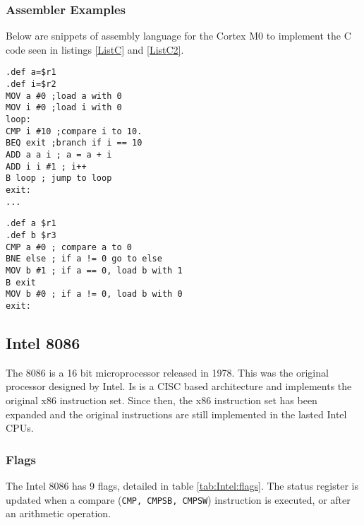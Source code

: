 \documentclass[12pt,a4paper]{article}
\begin{document}
\begin{bibunit}[is-unsrt]

\subsubsection{Assembler Examples}
Below are snippets of assembly language for the Cortex M0 to implement the C code seen in listings \ref{ListC} and \ref{ListC2}.
\begin{lstlisting}[frame=single,caption=Thumb/Thumb2 Assembler for code in listing \ref{ListC},label=ARM1]
.def a=$r1
.def i=$r2
MOV a #0 ;load a with 0
MOV i #0 ;load i with 0
loop:
CMP i #10 ;compare i to 10.
BEQ exit ;branch if i == 10
ADD a a i ; a = a + i 
ADD i i #1 ; i++ 
B loop ; jump to loop 
exit: 
...
\end{lstlisting}


\begin{lstlisting}[frame=single,caption=Thumb/Thumb2 Assembler for code in listing \ref{ListC2},label=ARM2]
.def a $r1
.def b $r3
CMP a #0 ; compare a to 0
BNE else ; if a != 0 go to else
MOV b #1 ; if a == 0, load b with 1
B exit
MOV b #0 ; if a != 0, load b with 0
exit:
\end{lstlisting}

\subsection{Intel 8086}

The 8086 is a 16 bit microprocessor released in 1978.
This was the original processor designed by Intel.
Is is a CISC based architecture and implements the original x86 instruction set.
Since then, the x86 instruction set has been expanded and the original instructions are still implemented in the lasted Intel CPUs.

\subsubsection{Flags}

The Intel 8086 has 9 flags, detailed in table \ref{tab:Intel:flags}.
The status register is updated when a compare (\texttt{CMP, CMPSB, CMPSW}) instruction is executed, or after an arithmetic operation.


\end{bibunit}
\end{document}
